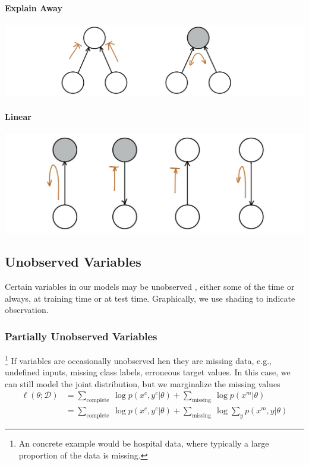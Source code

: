 \documentclass[11pt]{article}
\begin{document}
\paragraph{Explain Away}
\begin{center}
    \includegraphics[scale=0.25]{img/bayes_ball_explain_away}
\end{center}
\paragraph{Linear}
\begin{center}
    \includegraphics[scale=0.25]{img/bayes_ball_linear}
\end{center}

\subsection{Unobserved Variables}
Certain variables in our models may be unobserved , either some of the time or always, at training time or at test time. Graphically, we use shading to indicate observation.
\subsubsection{Partially Unobserved Variables}\footnote{An concrete example would be hospital data, where typically a large proportion of the data is missing. }
If variables are occasionally unobserved hen they are missing data, e.g., undefined inputs, missing class labels, erroneous target values. In this case, we can still model the joint distribution, but we marginalize the missing values
\begin{align}
    \ell(\theta ; \mathcal{D})&=\sum_{\text {complete }} \log p\left(x^{c}, y^{c} | \theta\right)+\sum_{\text {missing }} \log p\left(x^{m} | \theta\right) \\
    &=\sum_{\text {complete }} \log p\left(x^{c}, y^{c} | \theta\right)+\sum_{\text {missing }} \log \sum_{y} p\left(x^{m}, y | \theta\right)
\end{align}
\end{document}

